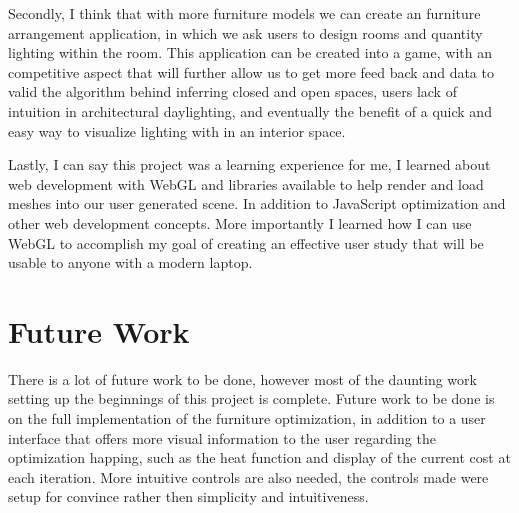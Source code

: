 \documentclass[twoside]{article}
\begin{document}
\begin{multicols}{2}
Secondly, I think that with more furniture models we can create an furniture arrangement application, in which we ask users to design
rooms and quantity lighting within the room. This application can be created into a game, with an competitive aspect that will further
allow us to get more feed back and data to valid the algorithm behind inferring closed and open spaces, users lack of intuition in architectural 
daylighting, and eventually the benefit of a quick and easy way to visualize lighting with in an interior space. 

Lastly, I can say this project was a learning experience for me, I learned about web development with WebGL and 
libraries available to help render and load meshes into our user generated scene. In addition to JavaScript optimization and other web development concepts.
More importantly I learned how I can use WebGL to accomplish my goal of creating an effective user study that will be usable to anyone
with a modern laptop.

\section{Future Work}
There is a lot of future work to be done, however most of the daunting work setting up the beginnings of this project is complete. 
Future work to be done is on the full implementation of the furniture optimization, in addition to a user interface that offers
more visual information to the user regarding the optimization happing, such as the heat function and display of the current cost at
each iteration. More intuitive controls are also needed, the controls made were setup for convince rather then simplicity and intuitiveness.







\end{multicols}
\end{document}
